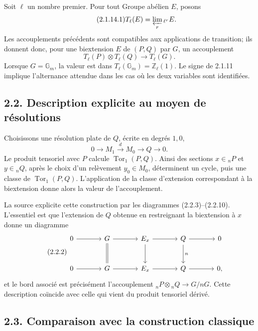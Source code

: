 \documentclass[11pt]{article}
\providecommand{\Tor}{\operatorname{Tor}}
\providecommand{\Gm}{\mathbb G_m}
\providecommand{\limproj}{\varprojlim}
\begin{document}
Soit \(\ell\) un nombre premier.  Pour tout Groupe abélien \(E\), posons
\begin{equation}\tag{2.1.14.1}
        T_\ell(E)=\limproj_r{}_{\ell^r}E.
\end{equation}
Les accouplements précédents sont compatibles aux applications de transition; ils donnent donc, pour une biextension \(E\) de \((P,Q)\) par \(G\), un accouplement
\begin{equation}\tag{2.1.14.2}
        T_\ell(P)\otimes T_\ell(Q)\longrightarrow T_\ell(G).
\end{equation}
Lorsque \(G=\Gm\), la valeur est dans \(T_\ell(\Gm)=\mathbb Z_\ell(1)\).  Le signe de 2.1.11 implique l'alternance attendue dans les cas où les deux variables sont identifiées.

\subsection*{2.2. Description explicite au moyen de résolutions}

Choisissons une résolution plate de \(Q\), écrite en degrés \(1,0\),
\begin{equation}\tag{2.2.1}
        0\longrightarrow M_1\xrightarrow{d}M_0\longrightarrow Q\longrightarrow0.
\end{equation}
Le produit tensoriel avec \(P\) calcule \(\Tor_1(P,Q)\).  Ainsi des sections \(x\in{}_nP\) et \(y\in{}_nQ\), après le choix d'un relèvement \(y_0\in M_0\), déterminent un cycle, puis une classe de \(\Tor_1(P,Q)\).  L'application de la classe d'extension correspondant à la biextension donne alors la valeur de l'accouplement.

La source explicite cette construction par les diagrammes (2.2.3)--(2.2.10).  L'essentiel est que l'extension de \(Q\) obtenue en restreignant la biextension à \(x\) donne un diagramme
\begin{equation}\tag{2.2.2}
\begin{tikzcd}[column sep=large,row sep=large]
0\arrow[r]&G\arrow[r]\arrow[d,equal]&E_x\arrow[r]\arrow[d]&Q\arrow[r]\arrow[d,"n"]&0\\
0\arrow[r]&G\arrow[r]&E_x\arrow[r]&Q\arrow[r]&0,
\end{tikzcd}
\end{equation}
et le bord associé est précisément l'accouplement \({}_nP\otimes{}_nQ\to G/nG\).  Cette description coïncide avec celle qui vient du produit tensoriel dérivé.

\subsection*{2.3. Comparaison avec la construction classique}
\end{document}
